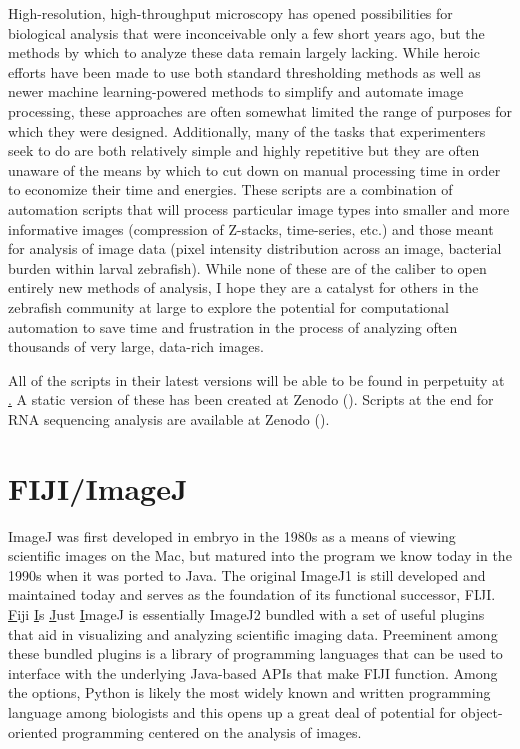 


High-resolution, high-throughput microscopy has opened possibilities for biological analysis that were inconceivable only a few short years ago, but the methods by which to analyze these data remain largely lacking. While heroic efforts have been made to use both standard thresholding methods as well as newer machine learning-powered methods to simplify and automate image processing, these approaches are often somewhat limited the range of purposes for which they were designed. Additionally, many of the tasks that experimenters seek to do are both relatively simple and highly repetitive but they are often unaware of the means by which to cut down on manual processing time in order to economize their time and energies. These scripts are a combination of automation scripts that will process particular image types into smaller and more informative images (compression of Z-stacks, time-series, etc.) and those meant for analysis of image data (pixel intensity distribution across an image, bacterial burden within larval zebrafish). While none of these are of the caliber to open entirely new methods of analysis, I hope they are a catalyst for others in the zebrafish community at large to explore the potential for computational automation to save time and frustration in the process of analyzing often thousands of very large, data-rich images.

All of the scripts in their latest versions will be able to be found in perpetuity at \href{http://github.com/jaredbrewer/image-analysis}. A static version of these has been created at Zenodo (). Scripts at the end for RNA sequencing analysis are available at Zenodo (). 

\section{FIJI/ImageJ}\label{fiji}

ImageJ was first developed in embryo in the 1980s as a means of viewing scientific images on the Mac, but matured into the program we know today in the 1990s when it was ported to Java. The original ImageJ1 is still developed and maintained today and serves as the foundation of its functional successor, FIJI. \underline{F}iji \underline{I}s \underline{J}ust \underline{I}mageJ is essentially ImageJ2 bundled with a set of useful plugins that aid in visualizing and analyzing scientific imaging data. Preeminent among these bundled plugins is a library of programming languages that can be used to interface with the underlying Java-based APIs that make FIJI function. Among the options, Python is likely the most widely known and written programming language among biologists and this opens up a great deal of potential for object-oriented programming centered on the analysis of images. 

